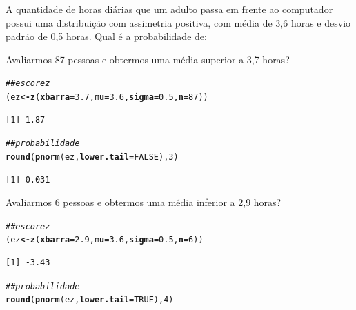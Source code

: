 \documentclass[a4paper,11pt,fleqn]{article}\usepackage[]{graphicx}\usepackage[]{color}
\makeatletter
\newcommand{\hlnum}[1]{\textcolor[rgb]{0,0,0}{#1}}%
\newcommand{\hlcom}[1]{\textcolor[rgb]{0.4,0.4,0.4}{\textit{#1}}}%
\newcommand{\hlstd}[1]{\textcolor[rgb]{0,0,0}{#1}}%
\newcommand{\hlkwb}[1]{\textcolor[rgb]{0,0,0}{\textbf{#1}}}%
\newcommand{\hlkwc}[1]{\textcolor[rgb]{0,0,0}{\textbf{#1}}}%
\newcommand{\hlkwd}[1]{\textcolor[rgb]{0,0,0}{\textbf{#1}}}%
\newenvironment{kframe}{%
 \def\at@end@of@kframe{}%
 \ifinner\ifhmode%
  \def\at@end@of@kframe{\end{minipage}}%
  \begin{minipage}{\columnwidth}%
 \fi\fi%
 \def\FrameCommand##1{\hskip\@totalleftmargin \hskip-\fboxsep
 \colorbox{shadecolor}{##1}\hskip-\fboxsep
     \hskip-\linewidth \hskip-\@totalleftmargin \hskip\columnwidth}%
 \MakeFramed {\advance\hsize-\width
   \@totalleftmargin\z@ \linewidth\hsize
   \@setminipage}}%
 {\par\unskip\endMakeFramed%
 \at@end@of@kframe}
\newenvironment{knitrout}{}{} %
\theoremstyle{definition}
\makeatother
\begin{document}
\begin{compactenum}[2.]
\item A quantidade de horas diárias que um adulto passa em frente ao
  computador possui uma distribuição com assimetria positiva, com média
  de 3,6 horas e desvio padrão de 0,5 horas. Qual é a probabilidade de:
  \begin{compactenum}
  \item Avaliarmos 87 pessoas e obtermos uma média superior a 3,7
    horas?
\begin{knitrout}\small
{}\color{fgcolor}\begin{kframe}
\begin{alltt}
\hlcom{## escore z}
\hlstd{(ez} \hlkwb{<-} \hlkwd{z}\hlstd{(}\hlkwc{xbarra} \hlstd{=} \hlnum{3.7}\hlstd{,} \hlkwc{mu} \hlstd{=} \hlnum{3.6}\hlstd{,} \hlkwc{sigma} \hlstd{=} \hlnum{0.5}\hlstd{,} \hlkwc{n} \hlstd{=} \hlnum{87}\hlstd{))}
\end{alltt}
\begin{verbatim}
[1] 1.87
\end{verbatim}
\begin{alltt}
\hlcom{## probabilidade}
\hlkwd{round}\hlstd{(}\hlkwd{pnorm}\hlstd{(ez,} \hlkwc{lower.tail} \hlstd{=} \hlnum{FALSE}\hlstd{),} \hlnum{3}\hlstd{)}
\end{alltt}
\begin{verbatim}
[1] 0.031
\end{verbatim}
\end{kframe}
\end{knitrout}
  \item Avaliarmos 6 pessoas e obtermos uma média inferior a 2,9 horas?
\begin{knitrout}\small
{}\color{fgcolor}\begin{kframe}
\begin{alltt}
\hlcom{## escore z}
\hlstd{(ez} \hlkwb{<-} \hlkwd{z}\hlstd{(}\hlkwc{xbarra} \hlstd{=} \hlnum{2.9}\hlstd{,} \hlkwc{mu} \hlstd{=} \hlnum{3.6}\hlstd{,} \hlkwc{sigma} \hlstd{=} \hlnum{0.5}\hlstd{,} \hlkwc{n} \hlstd{=} \hlnum{6}\hlstd{))}
\end{alltt}
\begin{verbatim}
[1] -3.43
\end{verbatim}
\begin{alltt}
\hlcom{## probabilidade}
\hlkwd{round}\hlstd{(}\hlkwd{pnorm}\hlstd{(ez,} \hlkwc{lower.tail} \hlstd{=} \hlnum{TRUE}\hlstd{),} \hlnum{4}\hlstd{)}
\end{alltt}

\end{kframe}
\end{knitrout}
\end{compactenum}
\end{compactenum}
\end{document}
